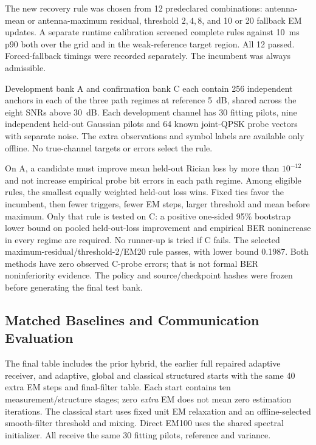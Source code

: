 The new recovery rule was chosen from 12 predeclared combinations: antenna-mean or antenna-maximum residual, threshold $2,4,8$, and 10 or 20 fallback EM updates. A separate runtime calibration screened complete rules against 10~ms p90 both over the grid and in the weak-reference target region. All 12 passed. Forced-fallback timings were recorded separately. The incumbent was always admissible.

Development bank A and confirmation bank C each contain 256 independent anchors in each of the three path regimes at reference 5~dB, shared across the eight SNRs above 30~dB. Each development channel has 30 fitting pilots, nine independent held-out Gaussian pilots and 64 known joint-QPSK probe vectors with separate noise. The extra observations and symbol labels are available only offline. No true-channel targets or errors select the rule.

On A, a candidate must improve mean held-out Rician loss by more than $10^{-12}$ and not increase empirical probe bit errors in each path regime. Among eligible rules, the smallest equally weighted held-out loss wins. Fixed ties favor the incumbent, then fewer triggers, fewer EM steps, larger threshold and mean before maximum. Only that rule is tested on C: a positive one-sided 95\% bootstrap lower bound on pooled held-out-loss improvement and empirical BER nonincrease in every regime are required. No runner-up is tried if C fails. The selected maximum-residual/threshold-2/EM20 rule passes, with lower bound 0.1987. Both methods have zero observed C-probe errors; that is not formal BER noninferiority evidence. The policy and source/checkpoint hashes were frozen before generating the final test bank.

\subsection{Matched Baselines and Communication Evaluation}
The final table includes the prior hybrid, the earlier full repaired adaptive receiver, and adaptive, global and classical structured starts with the same 40 extra EM steps and final-filter table. Each start contains ten measurement/structure stages; zero \emph{extra} EM does not mean zero estimation iterations. The classical start uses fixed unit EM relaxation and an offline-selected smooth-filter threshold and mixing. Direct EM100 uses the shared spectral initializer. All receive the same 30 fitting pilots, reference and variance.

